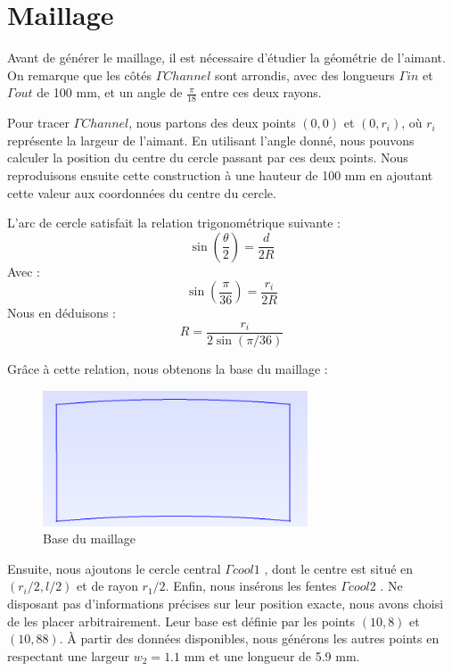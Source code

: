 \documentclass{article}
\begin{document}
\section{Maillage}

Avant de générer le maillage, il est nécessaire d'étudier la géométrie de l'aimant. On remarque que les côtés  \textit{\( \Gamma Channel \)} sont arrondis, avec des longueurs \textit{\( \Gamma  in\)} et \textit{\( \Gamma  out\)} de 100 mm, et un angle de \( \frac{\pi}{18} \) entre ces deux rayons.

Pour tracer \textit{\( \Gamma  Channel \)}, nous partons des deux points \((0,0)\) et \((0, r_i)\), où \( r_i \) représente la largeur de l'aimant. En utilisant l'angle donné, nous pouvons calculer la position du centre du cercle passant par ces deux points. Nous reproduisons ensuite cette construction à une hauteur de 100 mm en ajoutant cette valeur aux coordonnées du centre du cercle.

L’arc de cercle satisfait la relation trigonométrique suivante :
\begin{equation}
\sin\left(\frac{\theta}{2}\right) = \frac{d}{2R}
\end{equation}
Avec :
\begin{equation}
\sin\left(\frac{\pi}{36}\right) = \frac{r_i}{2R}
\end{equation}
Nous en déduisons :
\begin{equation}
R = \frac{r_i}{2 \sin(\pi/36)}
\end{equation}

Grâce à cette relation, nous obtenons la base du maillage :

\begin{figure}[H]
    \centering
    \includegraphics[width=0.7\textwidth]{images/gmsh_1.png}
    \caption{Base du maillage}
\end{figure}

Ensuite, nous ajoutons le cercle central \textit{\( \Gamma  cool 1 \) }, dont le centre est situé en \( (r_i/2, l/2) \) et de rayon \( r_1/2 \). Enfin, nous insérons les fentes \textit{\( \Gamma  cool 2 \) }. Ne disposant pas d’informations précises sur leur position exacte, nous avons choisi de les placer arbitrairement. Leur base est définie par les points \((10,8)\) et \((10,88)\). À partir des données disponibles, nous générons les autres points en respectant une largeur \( w_2 = 1.1 \) mm et une longueur de 5.9 mm. 
\end{document}
